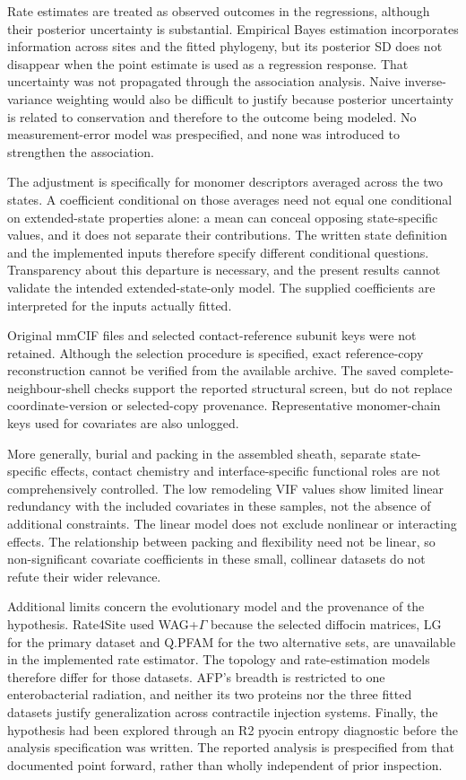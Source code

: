 \documentclass[11pt,a4paper]{article}
\begin{document}
Rate estimates are treated as observed outcomes in the regressions, although their posterior uncertainty is substantial. Empirical Bayes estimation incorporates information across sites and the fitted phylogeny,\cite{ref9} but its posterior SD does not disappear when the point estimate is used as a regression response. That uncertainty was not propagated through the association analysis. Naive inverse-variance weighting would also be difficult to justify because posterior uncertainty is related to conservation and therefore to the outcome being modeled. No measurement-error model was prespecified, and none was introduced to strengthen the association.

The adjustment is specifically for monomer descriptors averaged across the two states. A coefficient conditional on those averages need not equal one conditional on extended-state properties alone: a mean can conceal opposing state-specific values, and it does not separate their contributions. The written state definition and the implemented inputs therefore specify different conditional questions. Transparency about this departure is necessary, and the present results cannot validate the intended extended-state-only model. The supplied coefficients are interpreted for the inputs actually fitted.

Original mmCIF files and selected contact-reference subunit keys were not retained. Although the selection procedure is specified, exact reference-copy reconstruction cannot be verified from the available archive. The saved complete-neighbour-shell checks support the reported structural screen, but do not replace coordinate-version or selected-copy provenance. Representative monomer-chain keys used for covariates are also unlogged.

More generally, burial and packing in the assembled sheath, separate state-specific effects, contact chemistry and interface-specific functional roles are not comprehensively controlled. The low remodeling VIF values show limited linear redundancy with the included covariates in these samples, not the absence of additional constraints. The linear model does not exclude nonlinear or interacting effects. The relationship between packing and flexibility need not be linear,\cite{ref7} so non-significant covariate coefficients in these small, collinear datasets do not refute their wider relevance.

Additional limits concern the evolutionary model and the provenance of the hypothesis. Rate4Site used WAG+\ensuremath{\Gamma} because the selected diffocin matrices, LG for the primary dataset and Q.PFAM for the two alternative sets, are unavailable in the implemented rate estimator. The topology and rate-estimation models therefore differ for those datasets. AFP's breadth is restricted to one enterobacterial radiation, and neither its two proteins nor the three fitted datasets justify generalization across contractile injection systems. Finally, the hypothesis had been explored through an R2 pyocin entropy diagnostic before the analysis specification was written. The reported analysis is prespecified from that documented point forward, rather than wholly independent of prior inspection.
\end{document}
